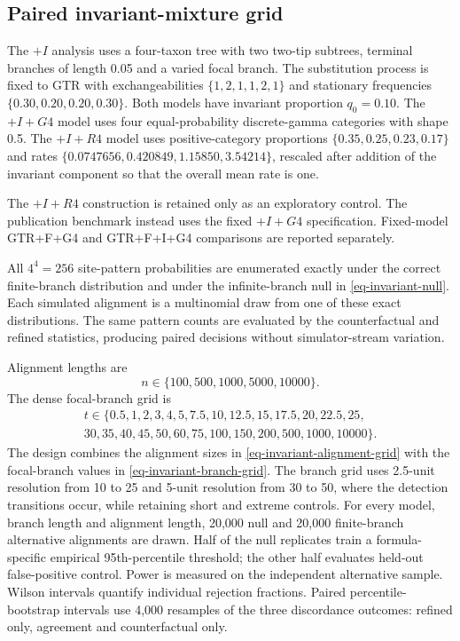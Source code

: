 \subsection*{Paired invariant-mixture grid}

The \(+I\) analysis uses a four-taxon tree with two two-tip subtrees, terminal branches of length 0.05 and a varied focal branch. The substitution process is fixed to GTR with exchangeabilities \(\{1,2,1,1,2,1\}\) and stationary frequencies \(\{0.30,0.20,0.20,0.30\}\). Both models have invariant proportion \(q_0=0.10\). The \(+I+G4\) model uses four equal-probability discrete-gamma categories with shape 0.5. The \(+I+R4\) model uses positive-category proportions \(\{0.35,0.25,0.23,0.17\}\) and rates \(\{0.0747656,0.420849,1.15850,3.54214\}\), rescaled after addition of the invariant component so that the overall mean rate is one.

The \(+I+R4\) construction is retained only as an exploratory control. The publication benchmark instead uses the fixed \(+I+G4\) specification. Fixed-model GTR+F+\allowbreak G4 and GTR+F+I+\allowbreak G4 comparisons are reported separately.

All \(4^4=256\) site-pattern probabilities are enumerated exactly under the correct finite-branch distribution and under the infinite-branch null in \cref{eq-invariant-null}. Each simulated alignment is a multinomial draw from one of these exact distributions. The same pattern counts are evaluated by the counterfactual and refined statistics, producing paired decisions without simulator-stream variation.

Alignment lengths are
\begin{equation}
n\in\{100,500,1000,5000,10000\}.
\label{eq-invariant-alignment-grid}
\end{equation}
The dense focal-branch grid is
\begin{multline}
t\in\{0.5,1,2,3,4,5,7.5,10,12.5,15,17.5,20,22.5,25,\\
30,35,40,45,50,60,75,100,150,200,500,1000,10000\}.
\label{eq-invariant-branch-grid}
\end{multline}
The design combines the alignment sizes in \cref{eq-invariant-alignment-grid} with the focal-branch values in \cref{eq-invariant-branch-grid}. The branch grid uses 2.5-unit resolution from 10 to 25 and 5-unit resolution from 30 to 50, where the detection transitions occur, while retaining short and extreme controls. For every model, branch length and alignment length, 20,000 null and 20,000 finite-branch alternative alignments are drawn. Half of the null replicates train a formula-specific empirical 95th-percentile threshold; the other half evaluates held-out false-positive control. Power is measured on the independent alternative sample. Wilson intervals quantify individual rejection fractions. Paired percentile-bootstrap intervals use 4,000 resamples of the three discordance outcomes: refined only, agreement and counterfactual only.
